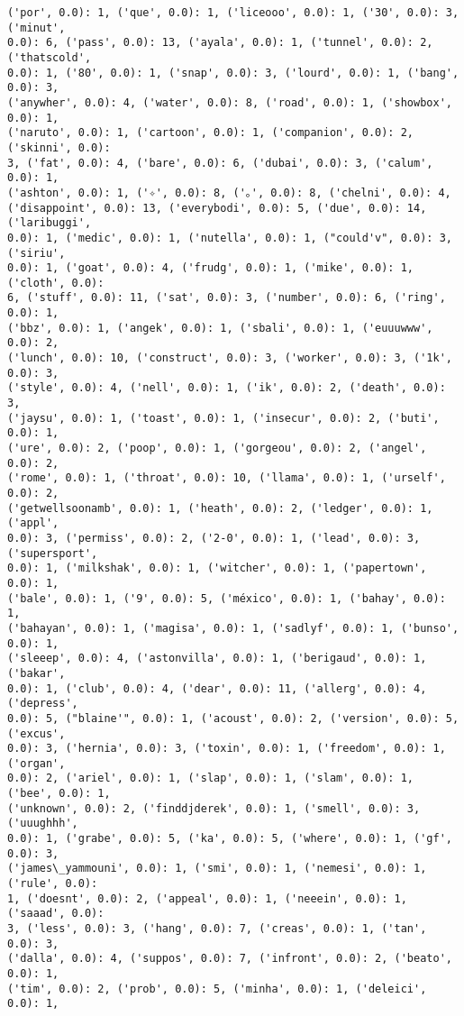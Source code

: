 \documentclass[11pt]{article}
\begin{document}
\begin{Verbatim}[commandchars=\\\{\}]
('por', 0.0): 1, ('que', 0.0): 1, ('liceooo', 0.0): 1, ('30', 0.0): 3, ('minut',
0.0): 6, ('pass', 0.0): 13, ('ayala', 0.0): 1, ('tunnel', 0.0): 2, ('thatscold',
0.0): 1, ('80', 0.0): 1, ('snap', 0.0): 3, ('lourd', 0.0): 1, ('bang', 0.0): 3,
('anywher', 0.0): 4, ('water', 0.0): 8, ('road', 0.0): 1, ('showbox', 0.0): 1,
('naruto', 0.0): 1, ('cartoon', 0.0): 1, ('companion', 0.0): 2, ('skinni', 0.0):
3, ('fat', 0.0): 4, ('bare', 0.0): 6, ('dubai', 0.0): 3, ('calum', 0.0): 1,
('ashton', 0.0): 1, ('✧', 0.0): 8, ('｡', 0.0): 8, ('chelni', 0.0): 4,
('disappoint', 0.0): 13, ('everybodi', 0.0): 5, ('due', 0.0): 14, ('laribuggi',
0.0): 1, ('medic', 0.0): 1, ('nutella', 0.0): 1, ("could'v", 0.0): 3, ('siriu',
0.0): 1, ('goat', 0.0): 4, ('frudg', 0.0): 1, ('mike', 0.0): 1, ('cloth', 0.0):
6, ('stuff', 0.0): 11, ('sat', 0.0): 3, ('number', 0.0): 6, ('ring', 0.0): 1,
('bbz', 0.0): 1, ('angek', 0.0): 1, ('sbali', 0.0): 1, ('euuuwww', 0.0): 2,
('lunch', 0.0): 10, ('construct', 0.0): 3, ('worker', 0.0): 3, ('1k', 0.0): 3,
('style', 0.0): 4, ('nell', 0.0): 1, ('ik', 0.0): 2, ('death', 0.0): 3,
('jaysu', 0.0): 1, ('toast', 0.0): 1, ('insecur', 0.0): 2, ('buti', 0.0): 1,
('ure', 0.0): 2, ('poop', 0.0): 1, ('gorgeou', 0.0): 2, ('angel', 0.0): 2,
('rome', 0.0): 1, ('throat', 0.0): 10, ('llama', 0.0): 1, ('urself', 0.0): 2,
('getwellsoonamb', 0.0): 1, ('heath', 0.0): 2, ('ledger', 0.0): 1, ('appl',
0.0): 3, ('permiss', 0.0): 2, ('2-0', 0.0): 1, ('lead', 0.0): 3, ('supersport',
0.0): 1, ('milkshak', 0.0): 1, ('witcher', 0.0): 1, ('papertown', 0.0): 1,
('bale', 0.0): 1, ('9', 0.0): 5, ('méxico', 0.0): 1, ('bahay', 0.0): 1,
('bahayan', 0.0): 1, ('magisa', 0.0): 1, ('sadlyf', 0.0): 1, ('bunso', 0.0): 1,
('sleeep', 0.0): 4, ('astonvilla', 0.0): 1, ('berigaud', 0.0): 1, ('bakar',
0.0): 1, ('club', 0.0): 4, ('dear', 0.0): 11, ('allerg', 0.0): 4, ('depress',
0.0): 5, ("blaine'", 0.0): 1, ('acoust', 0.0): 2, ('version', 0.0): 5, ('excus',
0.0): 3, ('hernia', 0.0): 3, ('toxin', 0.0): 1, ('freedom', 0.0): 1, ('organ',
0.0): 2, ('ariel', 0.0): 1, ('slap', 0.0): 1, ('slam', 0.0): 1, ('bee', 0.0): 1,
('unknown', 0.0): 2, ('finddjderek', 0.0): 1, ('smell', 0.0): 3, ('uuughhh',
0.0): 1, ('grabe', 0.0): 5, ('ka', 0.0): 5, ('where', 0.0): 1, ('gf', 0.0): 3,
('james\_yammouni', 0.0): 1, ('smi', 0.0): 1, ('nemesi', 0.0): 1, ('rule', 0.0):
1, ('doesnt', 0.0): 2, ('appeal', 0.0): 1, ('neeein', 0.0): 1, ('saaad', 0.0):
3, ('less', 0.0): 3, ('hang', 0.0): 7, ('creas', 0.0): 1, ('tan', 0.0): 3,
('dalla', 0.0): 4, ('suppos', 0.0): 7, ('infront', 0.0): 2, ('beato', 0.0): 1,
('tim', 0.0): 2, ('prob', 0.0): 5, ('minha', 0.0): 1, ('deleici', 0.0): 1,

\end{Verbatim}
\end{document}
